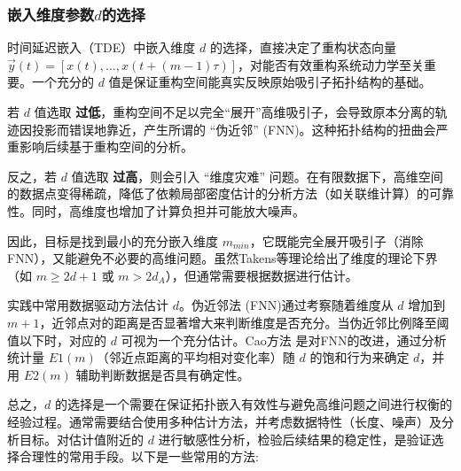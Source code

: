 \subsubsection{嵌入维度参数\(d\)的选择}
时间延迟嵌入（TDE）中嵌入维度 $d$ 的选择，直接决定了重构状态向量 $\vec{y}(t) = [x(t), \dots, x(t+(m-1)\tau)]$，对能否有效重构系统动力学至关重要。一个充分的 $d$ 值是保证重构空间能真实反映原始吸引子拓扑结构的基础。

若 $d$ 值选取 \textbf{过低}，重构空间不足以完全“展开”高维吸引子，会导致原本分离的轨迹因投影而错误地靠近，产生所谓的 “伪近邻” (FNN)。这种拓扑结构的扭曲会严重影响后续基于重构空间的分析。

反之，若 $d$ 值选取 \textbf{过高}，则会引入 “维度灾难” 问题。在有限数据下，高维空间的数据点变得稀疏，降低了依赖局部密度估计的分析方法（如关联维计算）的可靠性。同时，高维度也增加了计算负担并可能放大噪声。

因此，目标是找到最小的充分嵌入维度 $m_{min}$，它既能完全展开吸引子（消除FNN），又能避免不必要的高维问题。虽然Takens等理论给出了维度的理论下界（如 $m \ge 2d+1$ 或 $m > 2d_A$），但通常需要根据数据进行估计。

实践中常用数据驱动方法估计 $d$。伪近邻法 (FNN)\cite{rhodes1997false}通过考察随着维度从 $d$ 增加到 $m+1$，近邻点对的距离是否显著增大来判断维度是否充分。当伪近邻比例降至阈值以下时，对应的 $d$ 可视为一个充分估计。Cao方法\cite{cao1997practical} 是对FNN的改进，通过分析统计量 $E1(m)$（邻近点距离的平均相对变化率）随 $d$ 的饱和行为来确定 $d$，并用 $E2(m)$ 辅助判断数据是否具有确定性。

总之，$d$ 的选择是一个需要在保证拓扑嵌入有效性与避免高维问题之间进行权衡的经验过程。通常需要结合使用多种估计方法，并考虑数据特性（长度、噪声）及分析目标。对估计值附近的 $d$ 进行敏感性分析，检验后续结果的稳定性，是验证选择合理性的常用手段。以下是一些常用的方法:
\newpage

